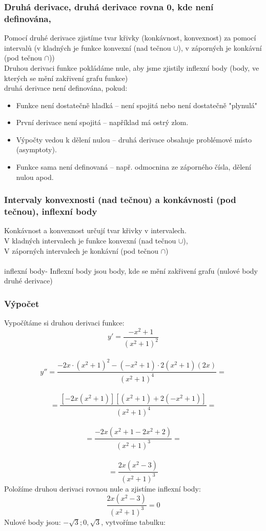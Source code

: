\subsubsection{Druhá derivace, druhá derivace rovna 0, kde není definována,}
Pomocí druhé derivace zjistíme tvar křivky (konkávnost, konvexnost) za pomocí intervalů (v kladných je funkce konvexní (nad tečnou $\cup$), v záporných je konkávní (pod tečnou $\cap$))  \\
Druhou derivaci funkce pokládáme nule, aby jsme zjistily inflexní body (body, ve kterých se mění zakřivení grafu funkce) \\
druhá derivace není definována, pokud:
\begin{itemize}
    \item Funkce není dostatečně hladká – není spojitá nebo není dostatečně "plynulá"
    \item První derivace není spojitá – například má ostrý zlom.
    \item Výpočty vedou k dělení nulou – druhá derivace obsahuje problémové místo (asymptoty).
    \item Funkce sama není definovaná – např. odmocnina ze záporného čísla, dělení nulou apod.
\end{itemize}

\subsubsection{Intervaly konvexnosti (nad tečnou) a konkávnosti (pod tečnou), inflexní body}
Konkávnost a konvexnost určují tvar křivky v intervalech. \\
V kladných intervalech je funkce konvexní (nad tečnou $\cup$),\\ 
V záporných intervalech je konkávní (pod tečnou $\cap$) \\ \\
inflexní body- Inflexní body jsou body, kde se mění zakřivení grafu (nulové body druhé derivace)

\subsubsection{Výpočet}
Vypočítáme si druhou derivaci funkce:
$$
    y'=\frac{-x^2+1}{(x^2+1)^2}
$$\\
$$
    y''=\frac{-2x\cdot(x^2+1)^2-(-x^2+1)\cdot2(x^2+1)(2x)}{(x^2+1)^4}=
$$\\
$$
    =\frac{[-2x(x^2+1)][(x^2+1)+2(-x^2+1)]}{(x^2+1)^4}=
$$\\
$$
    =\frac{-2x(x^2+1-2x^2+2)}{(x^2+1)^3}=
$$\\
$$
    =\frac{2x(x^2-3)}{(x^2+1)^3}
$$
Položíme druhou derivaci rovnou nule a zjistíme inflexní body:
$$
    \frac{2x(x^2-3)}{(x^2+1)^3}=0
$$
Nulové body jsou: $-\sqrt{3};0,\sqrt{3} $, vytvoříme tabulku:

